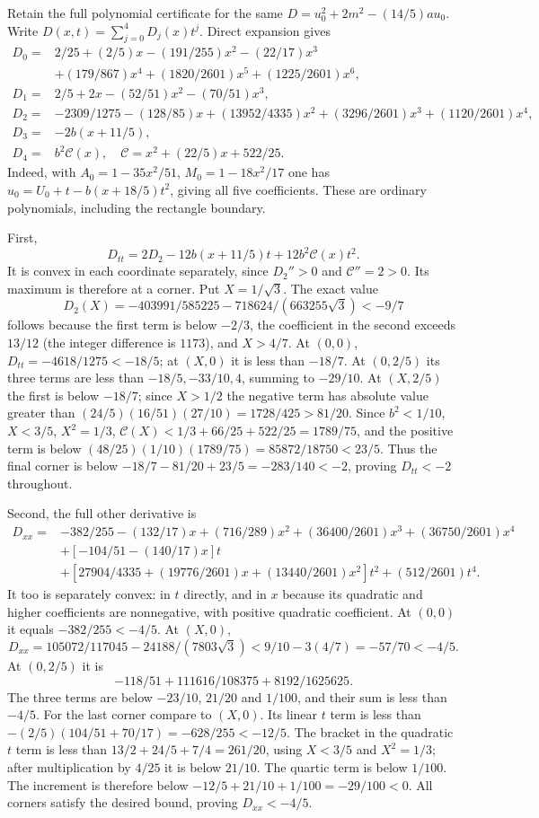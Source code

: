 Retain the full polynomial certificate for the same
$D=u_0^2+2m^2-(14/5)au_0$. Write
$D(x,t)=\sum_{j=0}^4D_j(x)t^j$. Direct expansion gives
\begin{align*}
D_0={}&2/25+(2/5)x-(191/255)x^2-(22/17)x^3\\
&+(179/867)x^4+(1820/2601)x^5+(1225/2601)x^6,\\
D_1={}&2/5+2x-(52/51)x^2-(70/51)x^3,\\
D_2={}&-2309/1275-(128/85)x+(13952/4335)x^2
+(3296/2601)x^3+(1120/2601)x^4,\\
D_3={}&-2b(x+11/5),\\
D_4={}&b^2\mathcal C(x),\quad\mathcal C=x^2+(22/5)x+522/25.
\end{align*}
Indeed, with $A_0=1-35x^2/51$, $M_0=1-18x^2/17$ one has
$u_0=U_0+t-b(x+18/5)t^2$, giving all five coefficients.
These are ordinary polynomials, including the rectangle boundary.

First,
\[
D_{tt}=2D_2-12b(x+11/5)t+12b^2\mathcal C(x)t^2.
\]
It is convex in each coordinate separately, since $D_2''>0$ and
$\mathcal C''=2>0$. Its maximum is therefore at a corner.
Put $X=1/\sqrt3$. The exact value
\[
D_2(X)=-403991/585225-718624/(663255\sqrt3)<-9/7
\]
follows because the first term is below $-2/3$, the coefficient in
the second exceeds $13/12$ (the integer difference is $1173$), and
$X>4/7$. At $(0,0)$, $D_{tt}=-4618/1275<-18/5$; at $(X,0)$ it is
less than $-18/7$. At $(0,2/5)$ its three terms are less than
$-18/5,-33/10,4$, summing to $-29/10$.
At $(X,2/5)$ the first is below $-18/7$; since $X>1/2$ the negative
term has absolute value greater than
$(24/5)(16/51)(27/10)=1728/425>81/20$.
Since $b^2<1/10$, $X<3/5$, $X^2=1/3$,
$\mathcal C(X)<1/3+66/25+522/25=1789/75$,
and the positive term is below
$(48/25)(1/10)(1789/75)=85872/18750<23/5$.
Thus the final corner is below
$-18/7-81/20+23/5=-283/140<-2$, proving $D_{tt}<-2$ throughout.

Second, the full other derivative is
\begin{align*}
D_{xx}={}&-382/255-(132/17)x+(716/289)x^2
+(36400/2601)x^3+(36750/2601)x^4\\
&+[-104/51-(140/17)x]t\\
&+[27904/4335+(19776/2601)x+(13440/2601)x^2]t^2
+(512/2601)t^4.
\end{align*}
It too is separately convex: in $t$ directly, and in $x$ because its
quadratic and higher coefficients are nonnegative, with positive
quadratic coefficient. At $(0,0)$ it equals $-382/255<-4/5$.
At $(X,0)$,
\[
D_{xx}=105072/117045-24188/(7803\sqrt3)
<9/10-3(4/7)=-57/70<-4/5.
\]
At $(0,2/5)$ it is
\[
-118/51+111616/108375+8192/1625625.
\]
The three terms are below $-23/10$, $21/20$ and $1/100$, and their
sum is less than $-4/5$.
For the last corner compare to $(X,0)$. Its linear $t$ term is less
than $-(2/5)(104/51+70/17)=-628/255<-12/5$.
The bracket in the quadratic $t$ term is less than
$13/2+24/5+7/4=261/20$, using $X<3/5$ and $X^2=1/3$;
after multiplication by $4/25$ it is below $21/10$.
The quartic term is below $1/100$.
The increment is therefore below $-12/5+21/10+1/100=-29/100<0$.
All corners satisfy the desired bound, proving $D_{xx}<-4/5$.

